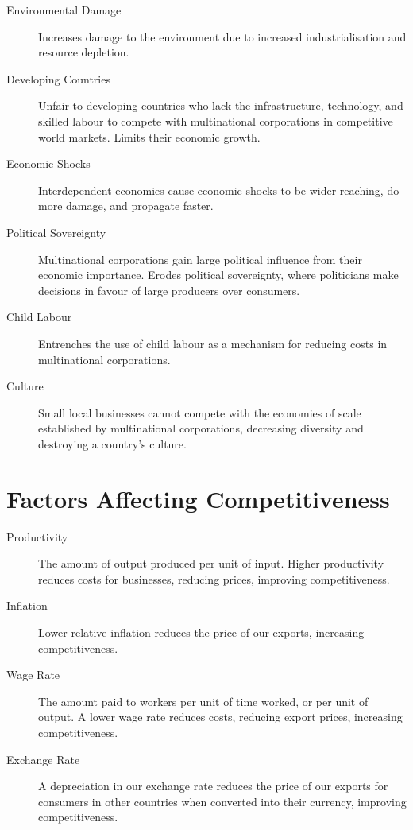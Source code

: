 \documentclass[a4paper,11pt]{report}
\begin{document}
\begin{description}
\item [Environmental Damage] Increases damage to the environment due to
	increased industrialisation and resource depletion.
\item [Developing Countries] Unfair to developing countries who lack the
	infrastructure, technology, and skilled labour to compete with multinational
	corporations in competitive world markets. Limits their economic growth.
\item [Economic Shocks] Interdependent economies cause economic shocks to be
	wider reaching, do more damage, and propagate faster.
\item [Political Sovereignty] Multinational corporations gain large political
	influence from their economic importance. Erodes political sovereignty,
	where politicians make decisions in favour of large producers over
	consumers.
\item [Child Labour] Entrenches the use of child labour as a mechanism for
	reducing costs in multinational corporations.
\item [Culture] Small local businesses cannot compete with the economies of
	scale established by multinational corporations, decreasing diversity
	and destroying a country's culture.
\end{description}


\section{Factors Affecting Competitiveness}

\begin{description}
\item [Productivity] The amount of output produced per unit of input. Higher
	productivity reduces costs for businesses, reducing prices, improving
	competitiveness.
\item [Inflation] Lower relative inflation reduces the price of our exports,
	increasing competitiveness.
\item [Wage Rate] The amount paid to workers per unit of time worked, or per
	unit of output. A lower wage rate reduces costs, reducing export prices,
	increasing competitiveness.
\item [Exchange Rate] A depreciation in our exchange rate reduces the price of
	our exports for consumers in other countries when converted into their
	currency, improving competitiveness.
\end{description}
\end{document}
